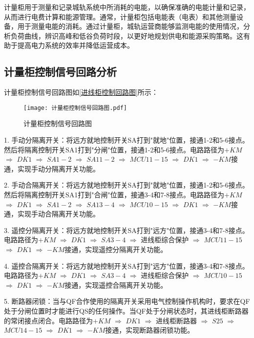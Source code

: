 计量柜用于测量和记录城轨系统中所消耗的电能，以确保准确的电能计量和记录，从而进行电费计算和能源管理。通常，计量柜包括电能表（电表）和其他测量设备，用于测量电能的消耗。通过计量柜，城轨运营商能够监测电能的使用情况，分析负荷曲线，辨识高峰和低谷负荷时段，以更好地规划供电和能源采购策略。这有助于提高电力系统的效率并降低运营成本。

\subsection{计量柜控制信号回路分析}
计量柜控制信号回路图如\ref{进线柜控制回路图}所示：

\begin{figure}[h]
	\centering
	\texttt{[image: 计量柜控制信号回路图.pdf]}
	\caption{计量柜控制信号回路图}
	\label{计量柜控制信号回路图}
\end{figure}

1. 手动分隔离开关：将远方就地控制开关SA打到"就地"位置，接通1-2和5-6接点。然后将隔离控制开关SA1打到"分闸"位置，接通1-2和5-6接点。电路路径为$+KM$ $\Longrightarrow $ $DK1$ $\Longrightarrow $ $SA1-2$ $\Longrightarrow $ $SA11-2$ $\Longrightarrow $ $MCU11-15$ $\Longrightarrow $ $DK1$ $\Longrightarrow $ $-KM$接通，实现手动分隔离开关功能。

2. 手动合隔离开关：将远方就地控制开关SA打到"就地"位置，接通1-2和5-6接点。然后将隔离控制开关SA1打到"合闸"位置，接通3-4和7-8接点。电路路径为$+KM$ $\Longrightarrow $ $DK1$ $\Longrightarrow $ $SA1-2$ $\Longrightarrow $ $SA13-4$ $\Longrightarrow $ $MCU10-15$ $\Longrightarrow $ $DK1$ $\Longrightarrow $ $-KM$接通，实现手动合隔离开关功能。

3. 遥控分隔离开关：将远方就地控制开关SA打到"远方"位置，接通3-4和7-8接点。电路路径为$+KM$ $\Longrightarrow $ $DK1$ $\Longrightarrow $ $SA3-4$ $\Longrightarrow $ 进线柜综合保护 $\Longrightarrow $ $MCU11-15$ $\Longrightarrow $ $DK1$ $\Longrightarrow $ $-KM$接通，实现遥控分隔离开关功能。

4. 遥控合隔离开关：将远方就地控制开关SA打到"远方"位置，接通3-4和7-8接点。电路路径为$+KM$ $\Longrightarrow $ $DK1$ $\Longrightarrow $ $SA3-4$ $\Longrightarrow $ 进线柜综合保护 $\Longrightarrow $ $MCU10-15$ $\Longrightarrow $ $DK1$ $\Longrightarrow $ $-KM$接通，实现遥控合隔离开关功能。

5. 断路器闭锁：当与QF合作使用的隔离开关采用电气控制操作机构时，要求在QF处于分闸位置时才能进行QS的任何操作。当QF处于分闸状态时，其进线柜断路器的常闭接点闭合。电路路径为$+KM$ $\Longrightarrow $ $DK1$ $\Longrightarrow $ 进线柜断路器 $\Longrightarrow $ $S25$ $\Longrightarrow $ $MCU14-15$ $\Longrightarrow $ $DK1$ $\Longrightarrow $ $-KM$接通，实现断路器闭锁功能。

